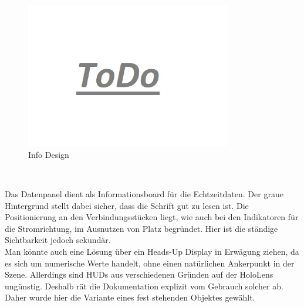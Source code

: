 \begin{figure}[h!]
	\centering
	\includegraphics[width=0.8\textwidth]{images/todo.jpg}
	\caption{Info Design}
	\label{img:info-design}
\end{figure}

\vspace{8px}
\begin{center}
	\\
\end{center}
\vspace{6px}

Das Datenpanel dient als Informationsboard für die Echtzeitdaten. Der graue Hintergrund stellt dabei sicher, dass die Schrift gut zu lesen ist. Die Positionierung an den Verbindungsstücken liegt, wie auch bei den Indikatoren für die Stromrichtung, im Ausnutzen von Platz begründet. Hier ist die ständige Sichtbarkeit jedoch sekundär.\\

Man könnte auch eine Lösung über ein Heads-Up Display in Erwägung ziehen, da es sich um numerische Werte handelt, ohne einen natürlichen Ankerpunkt in der Szene. Allerdings sind HUDs aus verschiedenen Gründen auf der HoloLens ungünstig. Deshalb rät die Dokumentation explizit vom Gebrauch solcher ab. Daher wurde hier die Variante eines fest stehenden Objektes gewählt.\\

